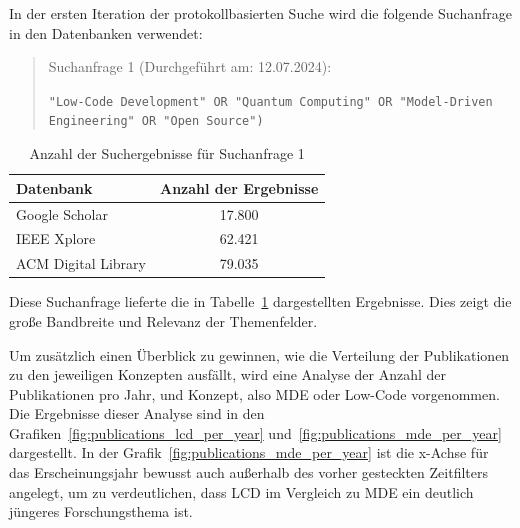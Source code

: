 
In der ersten Iteration der protokollbasierten Suche wird die folgende Suchanfrage in den Datenbanken verwendet:

\begin{quote}
    Suchanfrage 1 (Durchgeführt am: 12.07.2024):

    \texttt{"Low-Code Development" OR "Quantum Computing" OR "Model-Driven Engineering" OR "Open Source")}

\end{quote}

\begin{table}[h!]
    \centering
    \caption{Anzahl der Suchergebnisse für Suchanfrage 1}
    \begin{tabular}{|l|c|}
        \hline
        \textbf{Datenbank} & \textbf{Anzahl der Ergebnisse} \\ \hline
        Google Scholar & 17.800 \\ \hline
        IEEE Xplore & 62.421 \\ \hline
        ACM Digital Library & 79.035 \\ \hline
    \end{tabular}
\label{tab:search_1_results}
\end{table}
    
Diese Suchanfrage lieferte die in Tabelle~\ref{tab:search_1_results} dargestellten Ergebnisse. Dies 
zeigt die große Bandbreite und Relevanz der Themenfelder. 

Um zusätzlich einen Überblick zu gewinnen, wie die Verteilung der Publikationen zu den jeweiligen Konzepten ausfällt, 
wird eine Analyse der Anzahl der Publikationen pro Jahr, und Konzept, also MDE oder Low-Code vorgenommen. 
Die Ergebnisse dieser Analyse sind in den Grafiken~\ref{fig:publications_lcd_per_year} und~\ref{fig:publications_mde_per_year} dargestellt. 
In der Grafik~\ref{fig:publications_mde_per_year} ist die x-Achse für das Erscheinungsjahr bewusst auch außerhalb des vorher gesteckten Zeitfilters 
angelegt, um zu verdeutlichen, dass LCD im Vergleich zu MDE ein deutlich jüngeres Forschungsthema ist.


